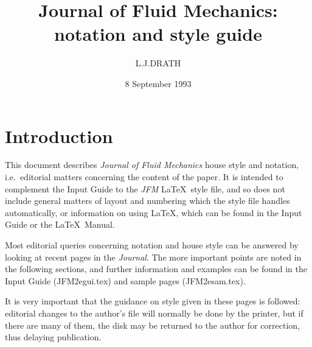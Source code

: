 \documentclass{jfm}
\title[Notation and style guide]{Journal of Fluid Mechanics:\\%
       notation and style guide}
\author[L. J. Drath]{L.\ns J.\ns D\ls R\ls A\ls T\ls H}
\affiliation{Department of Applied Mathematics and Theoretical Physics, \\%
       Silver Street, Cambridge CB3 9EW, UK}
\date{8 September 1993}
\begin{document}
\maketitle

\section{Introduction}

This document describes \textit{Journal of Fluid Mechanics}
house style and notation, i.e.\ editorial matters concerning the content of
the paper. It is intended to complement the Input Guide to the
\textit{JFM} \LaTeX\ style file, and so does not include general matters of
layout and numbering which the style file handles automatically, or
information on using \LaTeX, which can be found in the Input Guide or the
\LaTeX\ Manual.

Most editorial queries concerning notation and house style can be answered by
looking at recent pages in the \textit{Journal}. The more important points are
noted in the following sections, and further information and examples
can be found in the Input Guide (JFM2egui.tex) and sample pages (JFM2esam.tex).

It is very important that the guidance on style given in these pages
is followed:
editorial changes to the author's file will normally be done by the
printer, but if there are many of them, the disk may be returned to
the author for correction, thus delaying publication.
\end{document}
